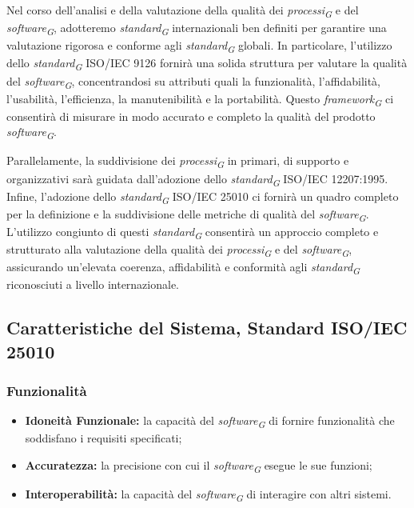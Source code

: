 Nel corso dell'analisi e della valutazione della qualità dei \textit{processi}\textsubscript{\textit{G}} e del \textit{software}\textsubscript{\textit{G}}, adotteremo \textit{standard}\textsubscript{\textit{G}} internazionali ben definiti per garantire una valutazione rigorosa e conforme agli \textit{standard}\textsubscript{\textit{G}} globali. In particolare, l'utilizzo dello \textit{standard}\textsubscript{\textit{G}} ISO/IEC 9126 fornirà una solida struttura per valutare la qualità del \textit{software}\textsubscript{\textit{G}}, concentrandosi su attributi quali la funzionalità, l'affidabilità, l'usabilità, l'efficienza, la manutenibilità e la portabilità. Questo \textit{framework}\textsubscript{\textit{G}} ci consentirà di misurare in modo accurato e completo la qualità del prodotto \textit{software}\textsubscript{\textit{G}}.

\vspace{0.2cm}

Parallelamente, la suddivisione dei \textit{processi}\textsubscript{\textit{G}} in primari, di supporto e organizzativi sarà guidata dall'adozione dello \textit{standard}\textsubscript{\textit{G}} ISO/IEC 12207:1995. Infine, l'adozione dello \textit{standard}\textsubscript{\textit{G}} ISO/IEC 25010 ci fornirà un quadro completo per la definizione e la suddivisione delle metriche di qualità del \textit{software}\textsubscript{\textit{G}}.
L'utilizzo congiunto di questi \textit{standard}\textsubscript{\textit{G}} consentirà un approccio completo e strutturato alla valutazione della qualità dei \textit{processi}\textsubscript{\textit{G}} e del \textit{software}\textsubscript{\textit{G}}, assicurando un'elevata coerenza, affidabilità e conformità agli \textit{standard}\textsubscript{\textit{G}} riconosciuti a livello internazionale.

\subsection{Caratteristiche del Sistema, Standard ISO/IEC 25010}

\subsubsection{Funzionalità}
\begin{itemize}
    \item \textbf{Idoneità Funzionale:} la capacità del \textit{software}\textsubscript{\textit{G}} di fornire funzionalità che soddisfano i requisiti specificati;
    \item \textbf{Accuratezza:} la precisione con cui il \textit{software}\textsubscript{\textit{G}} esegue le sue funzioni;
    \item \textbf{Interoperabilità:} la capacità del \textit{software}\textsubscript{\textit{G}} di interagire con altri sistemi.
\end{itemize}
\pagebreak


